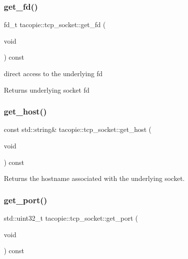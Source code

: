 \subsubsection{\texorpdfstring{get\+\_\+fd()}{get\_fd()}}
{\footnotesize\ttfamily fd\+\_\+t tacopie\+::tcp\+\_\+socket\+::get\+\_\+fd (\begin{DoxyParamCaption}\item[{void}]{ }\end{DoxyParamCaption}) const}

direct access to the underlying fd

\begin{DoxyReturn}{Returns}
underlying socket fd 
\end{DoxyReturn}
\mbox{\label{classtacopie_1_1tcp__socket_ad294565f9a0fa52639ecfbf133eecd59}} 
\subsubsection{\texorpdfstring{get\+\_\+host()}{get\_host()}}
{\footnotesize\ttfamily const std\+::string\& tacopie\+::tcp\+\_\+socket\+::get\+\_\+host (\begin{DoxyParamCaption}\item[{void}]{ }\end{DoxyParamCaption}) const}

\begin{DoxyReturn}{Returns}
the hostname associated with the underlying socket. 
\end{DoxyReturn}
\mbox{\label{classtacopie_1_1tcp__socket_a5276fdc687ac3c5089a05e3e2d9de4fb}} 
\subsubsection{\texorpdfstring{get\+\_\+port()}{get\_port()}}
{\footnotesize\ttfamily std\+::uint32\+\_\+t tacopie\+::tcp\+\_\+socket\+::get\+\_\+port (\begin{DoxyParamCaption}\item[{void}]{ }\end{DoxyParamCaption}) const}

